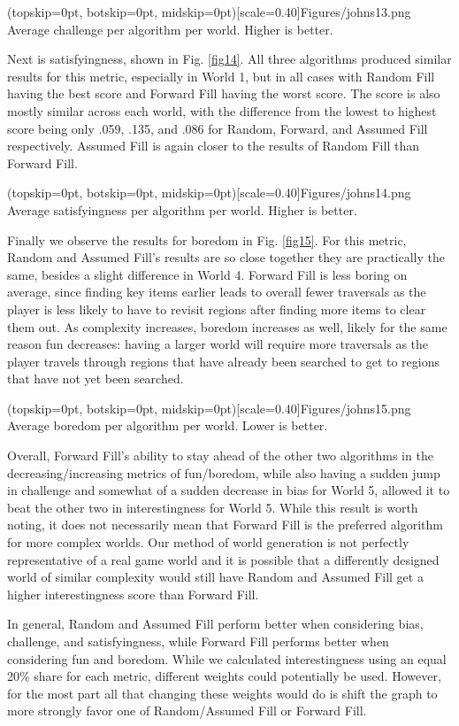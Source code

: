 \documentclass{ieeeaccess}
\begin{document}
\Figure[t!](topskip=0pt, botskip=0pt, midskip=0pt)[scale=0.40]{Figures/johns13.png}
{Average challenge per algorithm per world. Higher is better.\label{fig13}}

Next is satisfyingness, shown in Fig. \ref{fig14}. All three algorithms produced similar
results for this metric, especially in World 1, but in all cases with Random Fill having the
best score and Forward Fill having the worst score. The score is also mostly similar across
each world, with the difference from the lowest to highest score being only .059, .135, and
.086 for Random, Forward, and Assumed Fill respectively. Assumed Fill is again closer to the
results of Random Fill than Forward Fill.

\Figure[t!](topskip=0pt, botskip=0pt, midskip=0pt)[scale=0.40]{Figures/johns14.png}
{Average satisfyingness per algorithm per world. Higher is better.\label{fig14}}

Finally we observe the results for boredom in Fig. \ref{fig15}. For this metric, Random and
Assumed Fill’s results are so close together they are practically the same, besides a slight
difference in World 4. Forward Fill is less boring on average, since finding key items earlier
leads to overall fewer traversals as the player is less likely to have to revisit regions after
finding more items to clear them out. As complexity increases, boredom increases as well,
likely for the same reason fun decreases: having a larger world will require more traversals as
the player travels through regions that have already been searched to get to regions that have
not yet been searched.

\Figure[t!](topskip=0pt, botskip=0pt, midskip=0pt)[scale=0.40]{Figures/johns15.png}
{Average boredom per algorithm per world. Lower is better.\label{fig15}}

Overall, Forward Fill’s ability to stay ahead of the other two algorithms in the
decreasing/increasing metrics of fun/boredom, while also having a sudden jump in challenge and
somewhat of a sudden decrease in bias for World 5, allowed it to beat the other two in
interestingness for World 5. While this result is worth noting, it does not necessarily mean
that Forward Fill is the preferred algorithm for more complex worlds. Our method of world
generation is not perfectly representative of a real game world and it is possible that a
differently designed world of similar complexity would still have Random and Assumed Fill get a
higher interestingness score than Forward Fill. 

In general, Random and Assumed Fill perform better when considering bias, challenge, and
satisfyingness, while Forward Fill performs better when considering fun and boredom. While we
calculated interestingness using an equal 20\% share for each metric, different weights could
potentially be used. However, for the most part all that changing these weights would do is
shift the graph to more strongly favor one of Random/Assumed Fill or Forward Fill.
\end{document}
